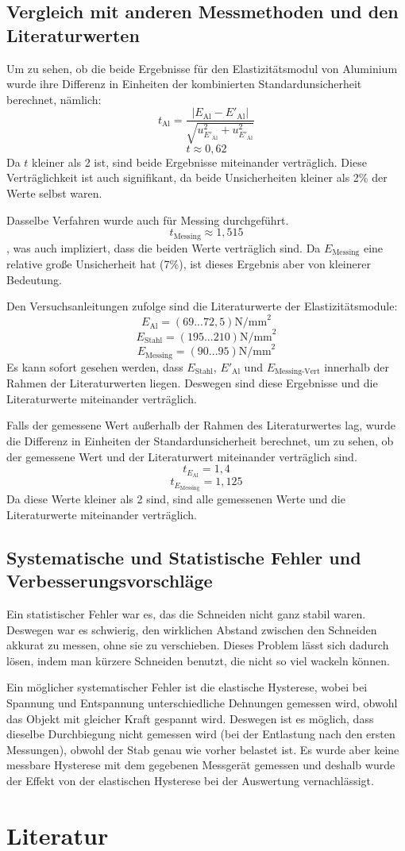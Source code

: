 \documentclass[11pt,a4paper]{article}
\begin{document}
\subsection{Vergleich mit anderen Messmethoden und den Literaturwerten}
Um zu sehen, ob die beide Ergebnisse für den Elastizitätsmodul von Aluminium wurde ihre Differenz in Einheiten der kombinierten Standardunsicherheit berechnet, nämlich:
$$ t_\textrm{Al} = \frac{|E_\textrm{Al}-E'_\textrm{Al}|}{
\sqrt{u_{E'_\textrm{Al}}^2+u_{E'_\textrm{Al}}^2}}$$
$$ t \approx 0,62 $$
Da $t$ kleiner als 2 ist, sind beide Ergebnisse miteinander verträglich. Diese Verträglichkeit ist auch signifikant, da beide Unsicherheiten kleiner als 2\% der Werte selbst waren. 

Dasselbe Verfahren wurde auch für Messing durchgeführt.
$$ t_\textrm{Messing} \approx 1,515 $$
, was auch impliziert, dass die beiden Werte verträglich sind. Da $E_\textrm{Messing}$ eine relative große Unsicherheit hat (7\%), ist dieses Ergebnis aber von kleinerer Bedeutung. 

Den Versuchsanleitungen zufolge sind die Literaturwerte der Elastizitätsmodule:
$$E_\textrm{Al} = (69 ... 72,5) \textrm{N/mm}^2$$
$$E_\textrm{Stahl} = (195 ... 210) \textrm{N/mm}^2$$
$$E_\textrm{Messing} = (90 ... 95) \textrm{N/mm}^2$$
Es kann sofort gesehen werden, dass $E_\textrm{Stahl}$, $E'_\textrm{Al}$ und $E_\textrm{Messing-Vert}$ innerhalb der Rahmen der Literaturwerten liegen. Deswegen sind diese Ergebnisse und die Literaturwerte miteinander verträglich. 

Falls der gemessene Wert außerhalb der Rahmen des Literaturwertes lag, wurde die Differenz in Einheiten der Standardunsicherheit berechnet, um zu sehen, ob der gemessene Wert und der Literaturwert miteinander verträglich sind. 
$$t_{E_\textrm{Al}} = 1,4$$
$$t_{E_\textrm{Messing}} = 1,125$$
Da diese Werte kleiner als 2 sind, sind alle gemessenen Werte und die Literaturwerte miteinander verträglich. 
\subsection{Systematische und Statistische Fehler und Verbesserungsvorschläge}
Ein statistischer Fehler war es, das die Schneiden nicht ganz stabil waren. Deswegen war es schwierig, den wirklichen Abstand zwischen den Schneiden akkurat zu messen, ohne sie zu verschieben. Dieses Problem lässt sich dadurch lösen, indem man kürzere Schneiden benutzt, die nicht so viel wackeln können. 

Ein möglicher systematischer Fehler ist die elastische Hysterese, wobei bei Spannung und Entspannung unterschiedliche Dehnungen gemessen wird, obwohl das Objekt mit gleicher Kraft gespannt wird. Deswegen ist es möglich, dass dieselbe Durchbiegung nicht gemessen wird (bei der Entlastung nach den ersten Messungen), obwohl der Stab genau wie vorher belastet ist. Es wurde aber keine messbare Hysterese mit dem gegebenen Messgerät gemessen und deshalb wurde der Effekt von der elastischen Hysterese bei der Auswertung vernachlässigt. 




\section{Literatur}
	
	
	
	
	
	
	
	
\end{document}
